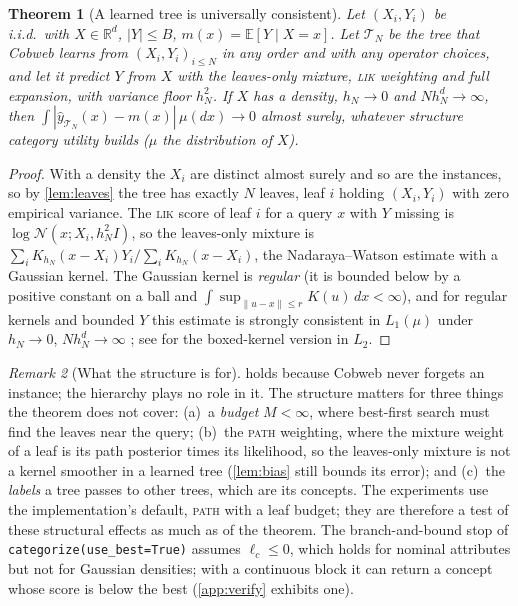 \documentclass[11pt]{article}
\newtheorem{theorem}{Theorem}
\theoremstyle{definition}
\theoremstyle{remark}
\newtheorem{remark}[theorem]{Remark}
\newcommand{\R}{\mathbb{R}}
\newcommand{\E}{\mathbb{E}}
\newcommand{\N}{\mathcal{N}}
\newcommand{\T}{\mathcal{T}}
\newcommand{\hy}{\hat{y}}
\begin{document}
\begin{theorem}[A learned tree is universally consistent]\label{thm:consistency}
Let $(X_i,Y_i)$ be i.i.d.\ with $X\in\R^d$, $|Y|\le B$, $m(x)=\E[Y\mid X=x]$.
Let $\T_N$ be the tree that Cobweb learns from $(X_i,Y_i)_{i\le N}$ in any order and with
any operator choices, and let it predict $Y$ from $X$ with the leaves-only mixture,
\textsc{lik} weighting and full expansion, with variance floor $h_N^2$.  If $X$ has a
density, $h_N\to0$ and $Nh_N^d\to\infty$, then
$\int|\hy_{\T_N}(x)-m(x)|\,\mu(dx)\to0$ almost surely, whatever structure category
utility builds ($\mu$ the distribution of $X$).
\end{theorem}
\begin{proof}
With a density the $X_i$ are distinct almost surely and so are the instances, so by
\cref{lem:leaves} the tree has exactly $N$ leaves, leaf $i$ holding $(X_i,Y_i)$ with zero
empirical variance.  The \textsc{lik} score of leaf $i$ for a query $x$ with $Y$
missing is $\log\N(x;X_i,h_N^2I)$, so the leaves-only mixture is
$\sum_iK_{h_N}(x-X_i)Y_i/\sum_iK_{h_N}(x-X_i)$, the Nadaraya--Watson estimate with
a Gaussian kernel.  The Gaussian kernel is \emph{regular} (it is bounded below by a
positive constant on a ball and $\int\sup_{\|u-x\|\le r}K(u)\,dx<\infty$), and for
regular kernels and bounded $Y$ this estimate is strongly consistent in $L_1(\mu)$
under $h_N\to0$, $Nh_N^d\to\infty$ \citep{devroye1989}; see \citet[Ch.~5]{gyorfi2002}
for the boxed-kernel version in $L_2$.
\end{proof}

\begin{remark}[What the structure is for]\label{rem:structure}
 holds because Cobweb never forgets an instance; the hierarchy
plays no role in it.  The structure matters for three things the theorem does not
cover: (a)~a \emph{budget} $M<\infty$, where best-first search must find the leaves
near the query; (b)~the \textsc{path} weighting, where the mixture weight of a leaf is
its path posterior times its likelihood, so the leaves-only mixture is not a kernel
smoother in a learned tree (\cref{lem:bias} still bounds its error); and (c)~the
\emph{labels} a tree passes to other trees, which are its concepts.  The experiments use
the implementation's default, \textsc{path} with a leaf budget; they are therefore a
test of these structural effects as much as of the theorem.  The branch-and-bound stop
of \texttt{categorize(use\_best=True)} assumes $\ell_c\le0$, which holds for nominal
attributes but not for Gaussian densities; with a continuous block it can return a
concept whose score is below the best (\cref{app:verify} exhibits one).
\end{remark}
\end{document}
